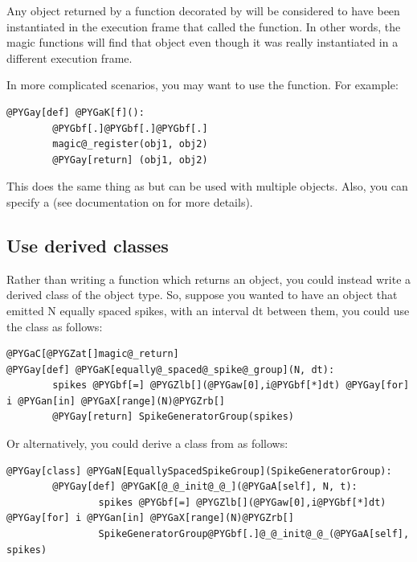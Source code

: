 \documentclass[letterpaper,10pt,english]{manual}
\begin{document}
Any object returned by a function decorated by \hyperlink{brian.magic_return}{} will be
considered to have been instantiated in the execution frame that called the
function. In other words, the magic functions will find that object even
though it was really instantiated in a different execution frame.

In more complicated scenarios, you may want to use the \hyperlink{brian.magic_register}{}
function. For example:

\begin{Verbatim}[commandchars=@\[\]]
@PYGay[def] @PYGaK[f]():
        @PYGbf[.]@PYGbf[.]@PYGbf[.]
        magic@_register(obj1, obj2)
        @PYGay[return] (obj1, obj2)
\end{Verbatim}

This does the same thing as \hyperlink{brian.magic_return}{} but can be used with
multiple objects. Also, you can specify a  (see documentation on
\hyperlink{brian.magic_register}{} for more details).

\subsection{Use derived classes}

Rather than writing a function which returns an object, you could instead
write a derived class of the object type. So, suppose you wanted to have an
object that emitted N equally spaced spikes, with an interval dt between
them, you could use the \hyperlink{brian.SpikeGeneratorGroup}{} class as follows:

\begin{Verbatim}[commandchars=@\[\]]
@PYGaC[@PYGZat[]magic@_return]
@PYGay[def] @PYGaK[equally@_spaced@_spike@_group](N, dt):
        spikes @PYGbf[=] @PYGZlb[](@PYGaw[0],i@PYGbf[*]dt) @PYGay[for] i @PYGan[in] @PYGaX[range](N)@PYGZrb[]
        @PYGay[return] SpikeGeneratorGroup(spikes)
\end{Verbatim}

Or alternatively, you could derive a class from \hyperlink{brian.SpikeGeneratorGroup}{}
as follows:

\begin{Verbatim}[commandchars=@\[\]]
@PYGay[class] @PYGaN[EquallySpacedSpikeGroup](SpikeGeneratorGroup):
        @PYGay[def] @PYGaK[@_@_init@_@_](@PYGaA[self], N, t):
                spikes @PYGbf[=] @PYGZlb[](@PYGaw[0],i@PYGbf[*]dt) @PYGay[for] i @PYGan[in] @PYGaX[range](N)@PYGZrb[]
                SpikeGeneratorGroup@PYGbf[.]@_@_init@_@_(@PYGaA[self], spikes)
\end{Verbatim}
\end{document}
